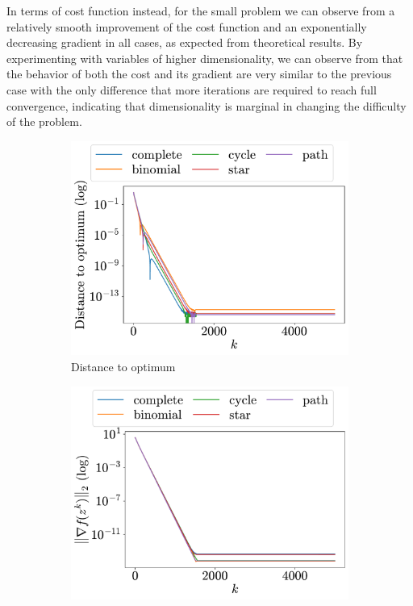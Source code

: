 \documentclass[a4paper,11pt,oneside]{book}
\begin{document}
In terms of cost function instead, for the small problem we can observe from  a relatively smooth improvement of the cost function and an exponentially decreasing gradient in all cases, as expected from theoretical results. By experimenting with variables of higher dimensionality, we can observe from  that the behavior of both the cost and its gradient are very similar to the previous case with the only difference that more iterations are required to reach full convergence, indicating that dimensionality is marginal in changing the difficulty of the problem. 

\begin{figure}[H]
      \centering
      \begin{subfigure}[t]{0.48\linewidth}
            \centering
            \includegraphics[width=\linewidth]{./figs/quadratic/5_3/distance.pdf} 
            \caption{Distance to optimum}
      \end{subfigure}
      \hfill
      \begin{subfigure}[t]{0.48\linewidth}
            \centering
            \includegraphics[width=\linewidth]{./figs/quadratic/5_3/gradient.pdf} 

\end{subfigure}
\end{figure}
\end{document}
